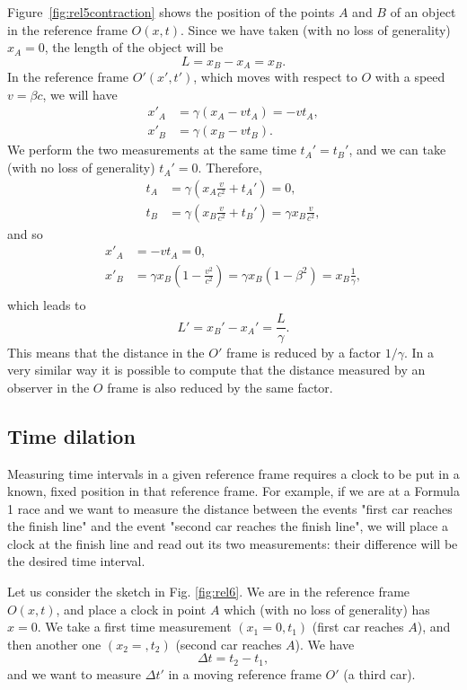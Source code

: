 Figure~\ref{fig:rel5contraction} shows the position of the points $A$ and $B$ of an object in the reference frame $O(x,t)$. Since we have taken (with no loss of generality) $x_A=0$, the length of the object will be
\[L=x_B-x_A=x_B.\]
In the reference frame $O'(x',t')$, which moves with respect to $O$ with a speed $v=\beta c$, we will have
\begin{align*}
x'_A&=\gamma\left(x_A-vt_A\right) = -vt_A,\\
x'_B&=\gamma\left(x_B-vt_B\right).
\end{align*}
We perform the two measurements at the same time $t_A'=t_B'$, and we can take (with no loss of generality) $t_A'=0$. Therefore,
\begin{align*}
t_A&=\gamma(x_A\frac{v}{c^2}+t_A')=0,\\
t_B&=\gamma(x_B\frac{v}{c^2}+t_B') = \gamma x_B \frac{v}{c^2},
\end{align*}
and so
\begin{align*}
x'_A &= -vt_A=0,\\
x'_B &= \gamma x_B \left(1-\frac{v^2}{c^2}\right) = \gamma x_B (1-\beta^2)= x_B \frac{1}{\gamma} ,\\
\end{align*}
which leads to
\begin{equation}
  L' = x_B'-x_A'=\frac{L}{\gamma}.
\end{equation}
This means that the distance in the $O'$ frame is reduced by a factor $1/\gamma$. In a very similar way it is possible to compute that the distance measured by an observer in the $O$ frame is also reduced by the same factor.

\subsection{Time dilation}
Measuring time intervals in a given reference frame requires a clock to be put in a known, fixed position in that reference frame. For example, if we are at a Formula 1 race and we want to measure the distance between the events "first car reaches the finish line" and the event "second car reaches the finish line", we will place a clock at the finish line and read out its two measurements: their difference will be the desired time interval.

Let us consider the sketch in Fig. \ref{fig:rel6}. We are in the reference frame $O(x,t)$, and place a clock in point $A$ which (with no loss of generality) has $x=0$. We take a first time measurement $(x_1=0,t_1)$ (first car reaches $A$), and then another one $(x_2=,t_2)$ (second car reaches $A$). We have
\[
\Delta t = t_2 - t_1,
\]
and we want to measure $\Delta t'$ in a moving reference frame $O'$ (a third car).


